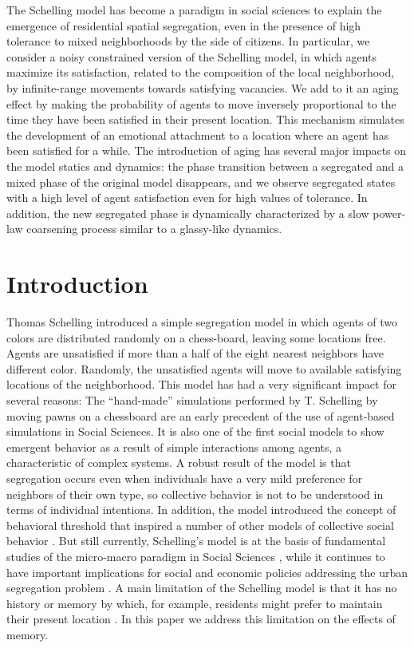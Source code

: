 
The Schelling model has become a paradigm in social sciences to explain the emergence of residential spatial segregation, even in the presence of high tolerance to mixed neighborhoods by the side of citizens. In particular, we consider a noisy constrained version of the Schelling model, in which agents maximize its satisfaction, related to the composition of the local neighborhood, by infinite-range movements towards satisfying vacancies. We add to it an aging effect by making the probability of agents to move inversely proportional to the time they have been satisfied in their present location. This mechanism simulates the development of an emotional attachment to a location where an agent has been satisfied for a while. The introduction of aging has several major impacts on the model statics and dynamics: the phase transition between a segregated and a mixed phase of the original model disappears, and we observe segregated states with a high level of agent satisfaction even for high values of tolerance. In addition, the new segregated phase is dynamically characterized by a slow power-law coarsening process similar to a glassy-like dynamics.

\section{Introduction}

Thomas Schelling introduced a simple segregation model   \cite{schelling-1969,Schelling,schellingbook,hegselmann-2017} in which agents of two colors are distributed randomly on a chess-board, leaving some locations free. Agents are unsatisfied if more than a half of the eight nearest neighbors have different color. Randomly, the unsatisfied agents will move to available satisfying locations of the neighborhood. This model has had a very significant impact for several reasons: The ``hand-made'' simulations performed by T. Schelling by moving pawns on a chessboard are an early precedent of the use of  agent-based simulations in Social Sciences. It is also one of the first social models to show emergent behavior as a result of simple interactions among agents, a characteristic of complex systems. A robust result of the model is that segregation occurs even when individuals have a very mild preference for neighbors of their own type, so collective behavior is not to be understood in terms of individual intentions. In addition, the model introduced the concept of behavioral threshold that inspired a number of other models of collective social behavior \cite{granovetter}. But still currently, Schelling's model is at the basis of fundamental studies of the micro-macro paradigm  in Social Sciences \cite{grauwin-2009}, while it continues to have important implications for social and economic policies addressing the urban segregation problem \cite{clark-1991,Sassen,Clark,lamanna-2018}. A main limitation of the Schelling model is that it has no history or memory by which, for example, residents might prefer to maintain their present location \cite{silver-2021}. In this paper we address this limitation on the effects of memory. 

